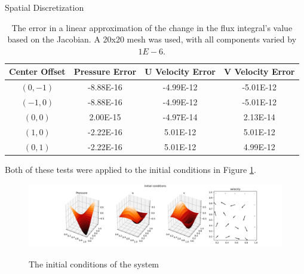 \documentclass{article}
\begin{document}
\begin{section}{Spatial Discretization}
\begin{table}[h]
  \begin{tabular}{|c|c|c|c|}
    \hline
    Center Offset & Pressure Error & U Velocity Error & V Velocity Error\\
    \hline
    $(0, -1)$     & -8.88E-16      & -4.99E-12        & -5.01E-12       \\
    $(-1, 0)$     & -8.88E-16      & -4.99E-12        & -5.01E-12       \\
    $(0, 0)$      &  2.00E-15      & -4.97E-14        &  2.13E-14       \\
    $(1, 0)$      & -2.22E-16      &  5.01E-12        &  5.01E-12       \\
    $(0, 1)$      & -2.22E-16      &  5.01E-12        &  4.99E-12       \\
    \hline
  \end{tabular}
  \label{jacobian}
  \caption{The error in a linear approximation of the change in the
    flux integral's value based on the Jacobian.
    A 20x20 mesh was used, with all components varied by $1E-6$.}
\end{table}
\end{section}

Both of these tests were applied to the initial conditions in Figure \ref{initial_conds}.
\begin{figure}[ht]
  \hspace{-30mm}
  \includegraphics[width=1.35\textwidth]{initial_conds/initial_conds.png}
  \label{initial_conds}
  \caption{The initial conditions of the system}
\end{figure}
\end{document}
